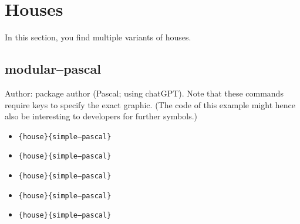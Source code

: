 \documentclass{article}
\begin{document}
\section{Houses}

In this section, you find multiple variants of houses.

\subsection{modular--pascal}

Author: package author (Pascal; using chatGPT). Note that these commands require keys to specify the exact graphic. (The code of this example might hence also be interesting to developers for further symbols.)

\begin{itemize}
  \item \texttt{\string\everydaySymbol\{house\}\{simple--pascal\}} \dotfill\ 

  \item \texttt{\string\everydaySymbol[config=\{middleDoor,chimney\}]\{house\}\{simple--pascal\}} \dotfill\ 

  \item \texttt{\string\everydaySymbol[config=\{rightDoor,leftWindow\}]\{house\}\{simple--pascal\}} \dotfill\ 

  \item \texttt{\string\everydaySymbol[config=twoWindows,color=red]\{house\}\{simple--pascal\}} \dotfill\ 

  \item \texttt{\string\everydaySymbol[config=\{twoWindows,middleDoor\}]\{house\}\{simple--pascal\}} \dotfill\ 

\end{itemize}
\end{document}
